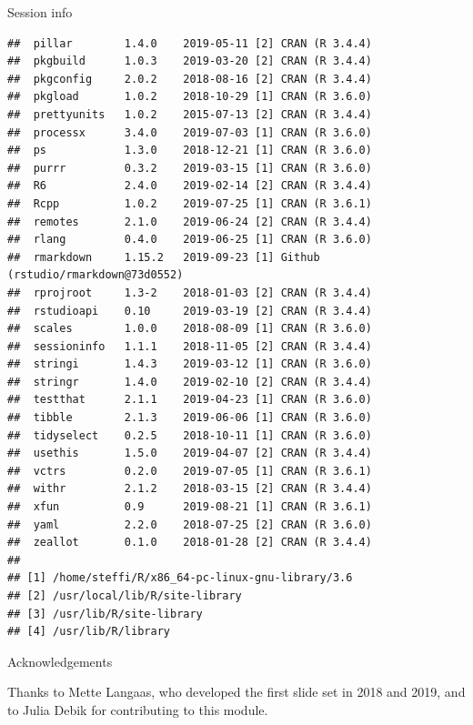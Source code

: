 \documentclass[ignorenonframetext,]{beamer}
\begin{document}
\begin{frame}[fragile]{Session info}
\begin{verbatim}
##  pillar        1.4.0    2019-05-11 [2] CRAN (R 3.4.4)                    
##  pkgbuild      1.0.3    2019-03-20 [2] CRAN (R 3.4.4)                    
##  pkgconfig     2.0.2    2018-08-16 [2] CRAN (R 3.4.4)                    
##  pkgload       1.0.2    2018-10-29 [1] CRAN (R 3.6.0)                    
##  prettyunits   1.0.2    2015-07-13 [2] CRAN (R 3.4.4)                    
##  processx      3.4.0    2019-07-03 [1] CRAN (R 3.6.0)                    
##  ps            1.3.0    2018-12-21 [1] CRAN (R 3.6.0)                    
##  purrr         0.3.2    2019-03-15 [1] CRAN (R 3.6.0)                    
##  R6            2.4.0    2019-02-14 [2] CRAN (R 3.4.4)                    
##  Rcpp          1.0.2    2019-07-25 [1] CRAN (R 3.6.1)                    
##  remotes       2.1.0    2019-06-24 [2] CRAN (R 3.4.4)                    
##  rlang         0.4.0    2019-06-25 [1] CRAN (R 3.6.0)                    
##  rmarkdown     1.15.2   2019-09-23 [1] Github (rstudio/rmarkdown@73d0552)
##  rprojroot     1.3-2    2018-01-03 [2] CRAN (R 3.4.4)                    
##  rstudioapi    0.10     2019-03-19 [2] CRAN (R 3.4.4)                    
##  scales        1.0.0    2018-08-09 [1] CRAN (R 3.6.0)                    
##  sessioninfo   1.1.1    2018-11-05 [2] CRAN (R 3.4.4)                    
##  stringi       1.4.3    2019-03-12 [1] CRAN (R 3.6.0)                    
##  stringr       1.4.0    2019-02-10 [2] CRAN (R 3.4.4)                    
##  testthat      2.1.1    2019-04-23 [1] CRAN (R 3.6.0)                    
##  tibble        2.1.3    2019-06-06 [1] CRAN (R 3.6.0)                    
##  tidyselect    0.2.5    2018-10-11 [1] CRAN (R 3.6.0)                    
##  usethis       1.5.0    2019-04-07 [2] CRAN (R 3.4.4)                    
##  vctrs         0.2.0    2019-07-05 [1] CRAN (R 3.6.1)                    
##  withr         2.1.2    2018-03-15 [2] CRAN (R 3.4.4)                    
##  xfun          0.9      2019-08-21 [1] CRAN (R 3.6.1)                    
##  yaml          2.2.0    2018-07-25 [2] CRAN (R 3.6.0)                    
##  zeallot       0.1.0    2018-01-28 [2] CRAN (R 3.4.4)                    
## 
## [1] /home/steffi/R/x86_64-pc-linux-gnu-library/3.6
## [2] /usr/local/lib/R/site-library
## [3] /usr/lib/R/site-library
## [4] /usr/lib/R/library
\end{verbatim}

\end{frame}

\begin{frame}{Acknowledgements}

Thanks to Mette Langaas, who developed the first slide set in 2018 and
2019, and to Julia Debik for contributing to this module.

\end{frame}
\end{document}
